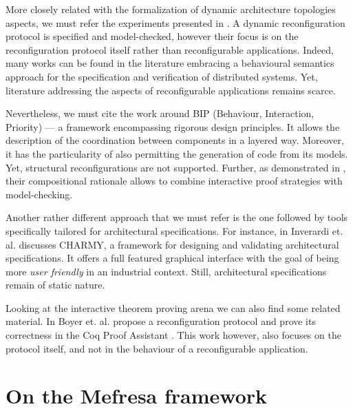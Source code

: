 		 	More closely related with the formalization of dynamic architecture topologies aspects,		 	
		 we must refer the experiments presented in 
	 \cite{conf/dais/CornejoGMP01}. A dynamic reconfiguration protocol is specified and model-checked,
	 however their focus is on the reconfiguration protocol itself rather than reconfigurable applications.
		Indeed, many works can be found in the literature embracing a behavioural semantics
	approach for the specification and verification of distributed systems. Yet, 
	literature addressing the aspects of reconfigurable applications remains 
	scarce. 
		
 	Nevertheless, we must cite the work around
	    BIP (Behaviour, Interaction, Priority) \cite{BBB+11a} --- a framework 
	 encompassing rigorous design principles. It allows the description of the 
	 coordination between components
	 in a layered way. Moreover, it has the particularity of also permitting the 
	 generation of code from its models. Yet, structural reconfigurations are not supported. 
	 Further, as demonstrated in \cite{BBN+10}, their compositional rationale	 allows to 	 
	 combine interactive proof strategies with model-checking.	 
	 	 	
	 	
	Another rather different approach that we must refer is the one followed by tools 
	specifically tailored for architectural specifications. For instance, in \cite{p.2005-1} Inverardi et. al. 
	discusses \textsf{CHARMY}, a framework for designing and validating architectural 
	specifications. It offers a full featured graphical interface with the goal of being more 
	\textit{user friendly} in an industrial context. Still,
	architectural specifications remain of static nature. 
	
		
	
		Looking at the interactive theorem proving arena we can also find some
	related material. In %
	\cite{Boyer:2013:RRC:2486788.2486791} Boyer et. al. propose a reconfiguration protocol
	and prove its correctness in the Coq Proof Assistant \cite{09thecoq}. This work however, also focuses on the protocol itself, 
	and not in the behaviour of a reconfigurable application. 
   





\section{On the Mefresa framework}
\label{sec:relmefresa}


